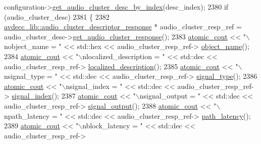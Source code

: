 \begin{DoxyCode}
      configuration->\hyperlink{classavdecc__lib_1_1configuration__descriptor_a36bc7f659fca61d1057b4250d4a92ca8}{get\_audio\_cluster\_desc\_by\_index}(desc\_index);
2380         \textcolor{keywordflow}{if} (audio\_cluster\_desc)
2381         \{
2382             \hyperlink{classavdecc__lib_1_1audio__cluster__descriptor__response}{avdecc\_lib::audio\_cluster\_descriptor\_response} * 
      audio\_cluster\_resp\_ref = audio\_cluster\_desc->\hyperlink{classavdecc__lib_1_1audio__cluster__descriptor_a82a4cedea1831a2939eccdf79d96986b}{get\_audio\_cluster\_response}();
2383             \hyperlink{cmd__line_8h_a0bc38ccc65c79ba06c6fcd7b4bf554c3}{atomic\_cout} << \textcolor{stringliteral}{"\(\backslash\)nobject\_name = "} << std::hex << audio\_cluster\_resp\_ref->
      \hyperlink{classavdecc__lib_1_1descriptor__response__base_a133f7774946d80f82b8aaaa4cfbb7361}{object\_name}();
2384             \hyperlink{cmd__line_8h_a0bc38ccc65c79ba06c6fcd7b4bf554c3}{atomic\_cout} << \textcolor{stringliteral}{"\(\backslash\)nlocalized\_description = "} << std::dec << audio\_cluster\_resp\_ref->
      \hyperlink{classavdecc__lib_1_1audio__cluster__descriptor__response_a1fb9de45567df344090a1407aa6b775f}{localized\_description}();
2385             \hyperlink{cmd__line_8h_a0bc38ccc65c79ba06c6fcd7b4bf554c3}{atomic\_cout} << \textcolor{stringliteral}{"\(\backslash\)nsignal\_type = "} << std::dec << audio\_cluster\_resp\_ref->
      \hyperlink{classavdecc__lib_1_1audio__cluster__descriptor__response_ac204637e5ecfc30b4cc47c0d78d81ce1}{signal\_type}();
2386             \hyperlink{cmd__line_8h_a0bc38ccc65c79ba06c6fcd7b4bf554c3}{atomic\_cout} << \textcolor{stringliteral}{"\(\backslash\)nsignal\_index = "} << std::dec << audio\_cluster\_resp\_ref->
      \hyperlink{classavdecc__lib_1_1audio__cluster__descriptor__response_aa1d83268f9a492f864d3e213acf71a97}{signal\_index}();
2387             \hyperlink{cmd__line_8h_a0bc38ccc65c79ba06c6fcd7b4bf554c3}{atomic\_cout} << \textcolor{stringliteral}{"\(\backslash\)nsignal\_output = "} << std::dec << audio\_cluster\_resp\_ref->
      \hyperlink{classavdecc__lib_1_1audio__cluster__descriptor__response_a729bc59f434e7de353db02db35977dfa}{signal\_output}();
2388             \hyperlink{cmd__line_8h_a0bc38ccc65c79ba06c6fcd7b4bf554c3}{atomic\_cout} << \textcolor{stringliteral}{"\(\backslash\)npath\_latency = "} << std::dec << audio\_cluster\_resp\_ref->
      \hyperlink{classavdecc__lib_1_1audio__cluster__descriptor__response_a48accc5f955ed908845e488ba5dcb5c7}{path\_latency}();
2389             \hyperlink{cmd__line_8h_a0bc38ccc65c79ba06c6fcd7b4bf554c3}{atomic\_cout} << \textcolor{stringliteral}{"\(\backslash\)nblock\_latency = "} << std::dec << audio\_cluster\_resp\_ref->

\end{DoxyCode}
